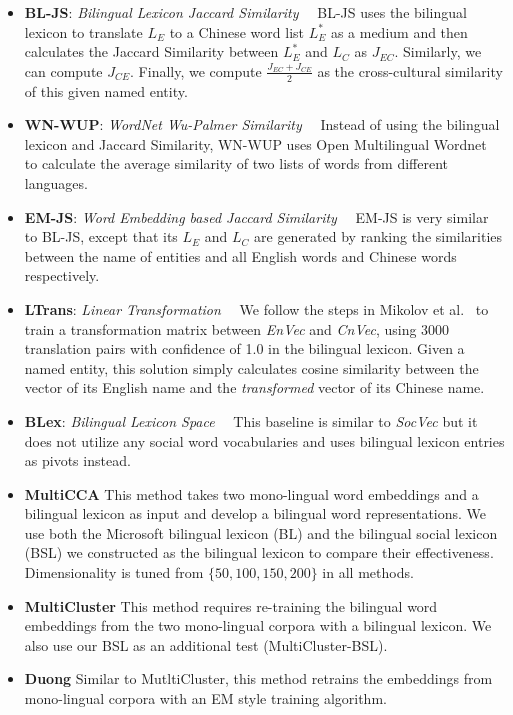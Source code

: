 \begin{itemize}[-]
 	\item \textbf{BL-JS}: \textit{Bilingual Lexicon Jaccard Similarity}~~
 	BL-JS uses the bilingual lexicon to translate $L_E$  to a Chinese word list 
 	$L_E^*$ as a medium and then calculates the Jaccard Similarity between 
 	$L_E^*$ and $L_C$ as $J_{EC}$. Similarly, we can compute $J_{CE}$. 
 	Finally, we compute $\frac{J_{EC}+J_{CE}}{2}$ as the cross-cultural similarity 
 	of this given named entity.
 	
 	\item \textbf{WN-WUP}:	\textit{WordNet Wu-Palmer Similarity}~~ Instead of using 
 	the bilingual lexicon and Jaccard Similarity, WN-WUP uses Open Multilingual 
 	Wordnet~\cite{wang2013building,bond2013linking} to calculate the average 
 	similarity of two lists of words from different languages.
 	
 	\item \textbf{EM-JS}: \textit {Word Embedding based Jaccard Similarity}~~ EM-JS is 
 	very similar to BL-JS, except that its $L_E$ and $L_C$ are generated by 
 	ranking the similarities between the name of entities and all English words 
 	and Chinese words respectively. 
 	
 	\item \textbf{LTrans}: \textit {Linear Transformation}~~
 	We follow the steps in Mikolov et al.~ 
 	to train a transformation matrix between \textit{EnVec} and \textit{CnVec}, 
 	using 3000 translation pairs with confidence of 1.0 in the bilingual lexicon. 
 	Given a named entity, this solution simply calculates cosine similarity 
 	between the vector of its English name and the \textit{transformed} vector 
 	of its Chinese name. 
 	
 	\item \textbf{BLex}: \textit {Bilingual Lexicon Space}~~
 	This baseline is similar to \textit{SocVec} but it does not 
 	utilize any social word vocabularies and  uses bilingual lexicon entries as pivots instead.
 	
 	\item	\textbf{{MultiCCA}}
 	\cite{ammar2016massively} This method takes two mono-lingual word 
embeddings and a bilingual lexicon as input and develop a bilingual word 
representations.  We use both the Microsoft bilingual lexicon (BL)
and the bilingual social lexicon (BSL) we constructed as the bilingual lexicon
to compare their effectiveness. Dimensionality is tuned from 
$\{50,100,150,200\}$ in all methods.
 	\item 	\textbf{{MultiCluster}} \cite{ammar2016massively} 
 	This method requires re-training the bilingual word embeddings from the two mono-lingual corpora with a bilingual lexicon. We also use our BSL as 
an additional test (MultiCluster-BSL). 
 	\item	\textbf{{Duong} }
 	\cite{duong2016learning}
 	Similar to MutltiCluster, this method retrains the embeddings from 
mono-lingual corpora with an EM style training algorithm. 


\end{itemize}
